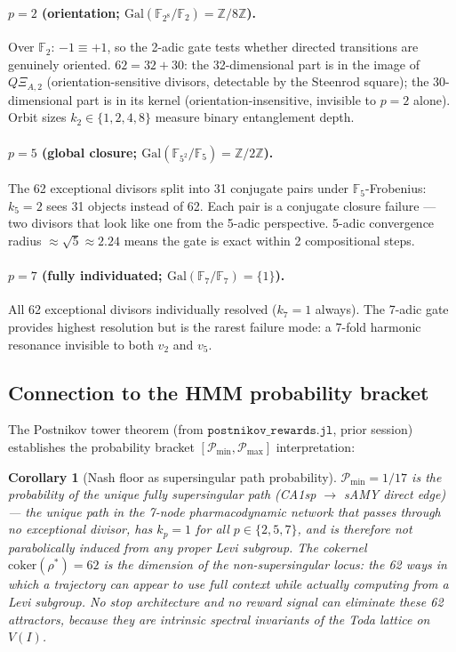 \documentclass[11pt]{amsart}
\newtheorem{corollary}[theorem]{Corollary}
\theoremstyle{definition}
\begin{document}
\paragraph{$p=2$ (orientation; $\mathrm{Gal}(\mathbb{F}_{2^8}/\mathbb{F}_2)
= \mathbb{Z}/8\mathbb{Z}$).}
Over $\mathbb{F}_2$: $-1 \equiv +1$, so the 2-adic gate tests whether
directed transitions are genuinely oriented.
$62 = 32 + 30$: the 32-dimensional part is in the image of
$Q\Xi_{A,2}$ (orientation-sensitive divisors, detectable by the
Steenrod square); the 30-dimensional part is in its kernel
(orientation-insensitive, invisible to $p=2$ alone).
Orbit sizes $k_2 \in \{1,2,4,8\}$ measure binary entanglement depth.

\paragraph{$p=5$ (global closure; $\mathrm{Gal}(\mathbb{F}_{5^2}/\mathbb{F}_5)
= \mathbb{Z}/2\mathbb{Z}$).}
The 62 exceptional divisors split into 31 conjugate pairs under
$\mathbb{F}_5$-Frobenius: $k_5 = 2$ sees 31 objects instead of 62.
Each pair is a conjugate closure failure --- two divisors that look
like one from the 5-adic perspective.
5-adic convergence radius $\approx \sqrt{5} \approx 2.24$ means
the gate is exact within 2 compositional steps.

\paragraph{$p=7$ (fully individuated; $\mathrm{Gal}(\mathbb{F}_7/\mathbb{F}_7)
= \{1\}$).}
All 62 exceptional divisors individually resolved ($k_7 = 1$ always).
The 7-adic gate provides highest resolution but is the rarest failure mode:
a 7-fold harmonic resonance invisible to both $v_2$ and $v_5$.

\subsection{Connection to the HMM probability bracket}

The Postnikov tower theorem (from $\mathtt{postnikov\_rewards.jl}$,
prior session) establishes the probability bracket
$[\mathcal{P}_{\min}, \mathcal{P}_{\max}]$ interpretation:

\begin{corollary}[Nash floor as supersingular path probability]
\label{cor:nash}
$\mathcal{P}_{\min} = 1/17$ is the probability of the unique fully
supersingular path (CA1sp $\to$ sAMY direct edge) --- the unique path
in the 7-node pharmacodynamic network that passes through no exceptional
divisor, has $k_p = 1$ for all $p \in \{2,5,7\}$, and is therefore
not parabolically induced from any proper Levi subgroup.
The cokernel $\mathrm{coker}(\rho^*) = 62$ is the dimension of the
non-supersingular locus: the 62 ways in which a trajectory can appear
to use full context while actually computing from a Levi subgroup.
No stop architecture and no reward signal can eliminate these 62
attractors, because they are intrinsic spectral invariants of the
Toda lattice on $V(I)$.
\end{corollary}
\end{document}
